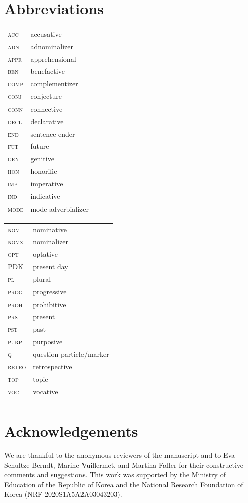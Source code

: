 \documentclass[output=paper,colorlinks,citecolor=brown]{langscibook}
\begin{document}
\section*{Abbreviations}
\begin{tabularx}{.5\textwidth}{@{}lQ@{}}
\textsc{acc} & accusative \\
\textsc{adn} & adnominalizer \\
\textsc{appr} & apprehensional \\
\textsc{ben} & benefactive \\
\textsc{comp} & complementizer \\
\textsc{conj} & conjecture \\
\textsc{conn} & connective \\
\textsc{decl} & declarative \\
\textsc{end} & sentence-ender \\
\textsc{fut} & future \\
\textsc{gen} & genitive \\
\textsc{hon} & honorific \\
\textsc{imp} & imperative \\
\textsc{ind} & indicative \\
\textsc{mode} & mode-adverbializer\end{tabularx}%
\begin{tabularx}{.5\textwidth}{@{}lQ@{}}
\textsc{nom} & nominative \\
\textsc{nomz} & nominalizer \\
\textsc{opt} & optative \\
PDK & present day  \\
\textsc{pl} & plural \\
\textsc{prog} & progressive \\
\textsc{proh} & prohibitive \\
\textsc{prs} & present\\
\textsc{pst} & past \\
\textsc{purp} & purposive \\
\textsc{q} & question particle/marker \\
\textsc{retro} & retrospective \\
\textsc{top} & topic \\
\textsc{voc} & vocative \\\\
\end{tabularx}

\section*{Acknowledgements}
We are thankful to the anonymous reviewers of the manuscript and to Eva Schultze-Berndt, Marine Vuillermet, and Martina Faller for their constructive comments and suggestions. This work was supported by the Ministry of Education of the Republic of Korea and the National Research Foundation of Korea (NRF-2020S1A5A2A03043203).




\printbibliography[heading=subbibliography,notkeyword=this]
\end{document}
